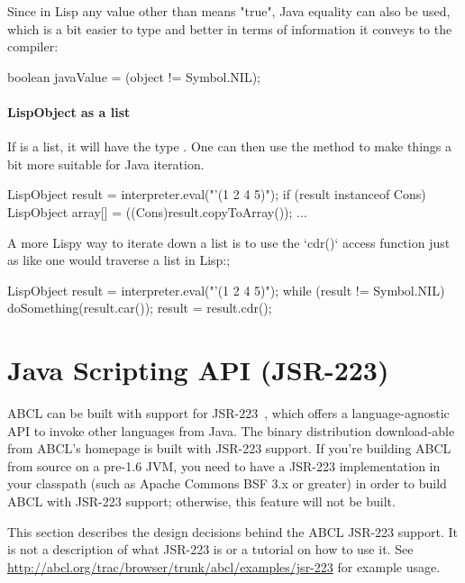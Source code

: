 \documentclass[10pt]{book}
\begin{document}
Since in Lisp any value other than  means "true", Java
equality can also be used, which is a bit easier to type and better in
terms of information it conveys to the compiler:

\begin{listing-java}
    boolean javaValue = (object != Symbol.NIL);
\end{listing-java}

\paragraph{LispObject as a list}

If  is a list, it will have the type .  One
can then use the  method to make things a bit more
suitable for Java iteration.

\begin{listing-java}
  LispObject result = interpreter.eval("'(1 2 4 5)");
  if (result instanceof Cons) {
    LispObject array[] = ((Cons)result.copyToArray());
    ...
  }
\end{listing-java}

A more Lispy way to iterate down a list is to use the `cdr()` access
function just as like one would traverse a list in Lisp:;

\begin{listing-java}
  LispObject result = interpreter.eval("'(1 2 4 5)");
  while (result != Symbol.NIL) {
    doSomething(result.car());
    result = result.cdr();
  }
\end{listing-java}

\section{Java Scripting API (JSR-223)}
\label{sec:java-scripting-api}

ABCL can be built with support for JSR-223~\cite{jsr-223}, which offers
a language-agnostic API to invoke other languages from Java. The binary
distribution download-able from ABCL's homepage is built with JSR-223
support. If you're building ABCL from source on a pre-1.6 JVM, you need
to have a JSR-223 implementation in your classpath (such as Apache
Commons BSF 3.x or greater) in order to build ABCL with JSR-223 support;
otherwise, this feature will not be built.

This section describes the design decisions behind the ABCL JSR-223
support. It is not a description of what JSR-223 is or a tutorial on
how to use it. See
\url{http://abcl.org/trac/browser/trunk/abcl/examples/jsr-223}
for example usage.
\end{document}
